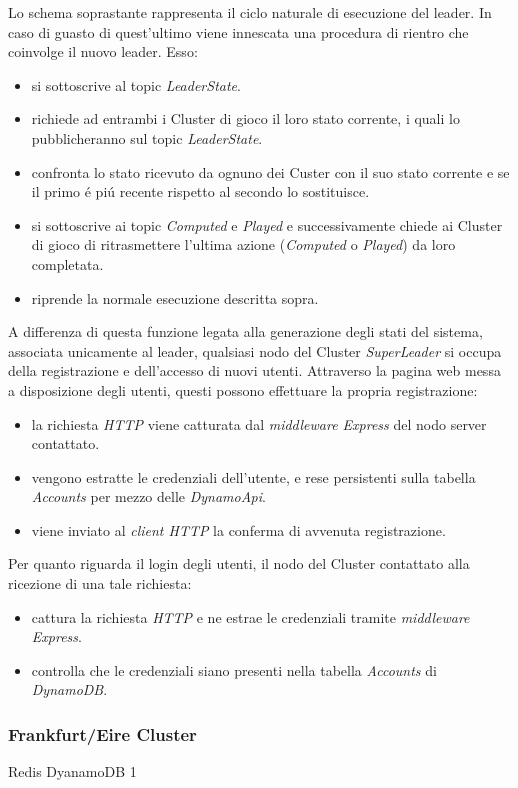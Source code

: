 \documentclass{sig-alternate-05-2015}
\begin{document}
Lo schema soprastante rappresenta il ciclo naturale di esecuzione del leader. In caso di guasto di quest'ultimo viene innescata una procedura di rientro che coinvolge il nuovo leader. Esso:
\begin{itemize}
\item si sottoscrive al topic \textit{LeaderState}.
\item richiede ad entrambi i Cluster di gioco il loro stato corrente, i quali lo pubblicheranno sul topic \textit{LeaderState}.
\item confronta lo stato ricevuto da ognuno dei Custer con il suo stato corrente e se il primo \'e pi\'u recente rispetto al secondo lo sostituisce.
\item si sottoscrive ai topic \textit{Computed} e \textit{Played} e successivamente chiede ai Cluster di gioco di ritrasmettere l'ultima azione (\textit{Computed} o \textit{Played}) da loro completata.
\item riprende la normale esecuzione descritta sopra.
\end{itemize} 

A differenza di questa funzione legata alla generazione degli stati del sistema, associata unicamente al leader, qualsiasi nodo del Cluster \textit{SuperLeader} si occupa della registrazione e dell'accesso di nuovi utenti. Attraverso la pagina web messa a disposizione degli utenti, questi possono effettuare la propria registrazione: 
\begin{itemize}
\item la richiesta \textit{HTTP} viene catturata dal \textit{middleware Express} del nodo server contattato.
\item vengono estratte le credenziali dell'utente, e rese persistenti sulla tabella \textit{Accounts} per mezzo delle \textit{DynamoApi}.
\item viene inviato al \textit{client HTTP} la conferma di avvenuta registrazione.
\end{itemize}
Per quanto riguarda il login degli utenti, il nodo del Cluster contattato alla ricezione di una tale richiesta:
\begin{itemize}
\item cattura la richiesta \textit{HTTP} e ne estrae le credenziali tramite \textit{middleware Express}.
\item controlla che le credenziali siano presenti nella tabella \textit{Accounts} di \textit{DynamoDB}.
\end{itemize}


\subsubsection{Frankfurt/Eire Cluster}
Redis DyanamoDB 1
\end{document}
